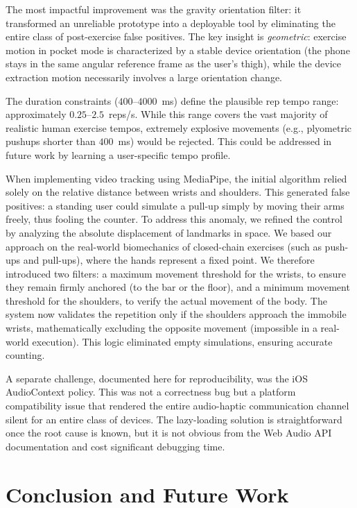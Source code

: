 \documentclass[11pt]{article}
\begin{document}
The most impactful improvement was the gravity orientation filter: it transformed an unreliable prototype into a deployable tool by eliminating the entire class of post-exercise false positives. The key insight is \textit{geometric}: exercise motion in pocket mode is characterized by a stable device orientation (the phone stays in the same angular reference frame as the user's thigh), while the device extraction motion necessarily involves a large orientation change.

The duration constraints ($400$--$4000$~ms) define the plausible rep tempo range: approximately $0.25$--$2.5$~reps/s. While this range covers the vast majority of realistic human exercise tempos, extremely explosive movements (e.g., plyometric pushups shorter than $400$~ms) would be rejected. This could be addressed in future work by learning a user-specific tempo profile.

When implementing video tracking using MediaPipe, the initial algorithm relied solely on the relative distance between wrists and shoulders. This generated false positives: a standing user could simulate a pull-up simply by moving their arms freely, thus fooling the counter. To address this anomaly, we refined the control by analyzing the absolute displacement of landmarks in space. We based our approach on the real-world biomechanics of closed-chain exercises (such as push-ups and pull-ups), where the hands represent a fixed point. We therefore introduced two filters: a maximum movement threshold for the wrists, to ensure they remain firmly anchored (to the bar or the floor), and a minimum movement threshold for the shoulders, to verify the actual movement of the body. The system now validates the repetition only if the shoulders approach the immobile wrists, mathematically excluding the opposite movement (impossible in a real-world execution). This logic eliminated empty simulations, ensuring accurate counting.

A separate challenge, documented here for reproducibility, was the iOS AudioContext policy. This was not a correctness bug but a platform compatibility issue that rendered the entire audio-haptic communication channel silent for an entire class of devices. The lazy-loading solution is straightforward once the root cause is known, but it is not obvious from the Web Audio API documentation and cost significant debugging time.

\section{Conclusion and Future Work}
\end{document}
